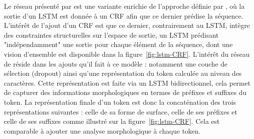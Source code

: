 \documentclass[citation\_needed]{subfiles}
\begin{document}
Le réseau présenté par \citet{lample2016neural} est une variante enrichie de l'approche définie par \citet{huang2015bidirectional}, où la sortie d'un LSTM est donnée à un CRF afin que ce dernier prédise la séquence. L'intérêt de l'ajout d'un CRF est que ce dernier, contrairement au LSTM, intègre des constraintes structurelles sur l'espace de sortie, un LSTM prédisant "indépendamment" une sortie pour chaque élément de la séquence, dont une vision d'ensemble est disponible dans la figure\ \ref{fig:lstm-CRF}. L'intérêt du réseau de \citet{lample2016neural} réside dans les ajouts qu'il fait à ce modèle : notamment une couche de sélection (dropout) ainsi qu'une représentation du token calculée au niveau des caractères. Cette représentation est faite via un LSTM bidirectionnel, cela permet de capturer des informations morphologiques en termes de préfixes et suffixes du token. La représentation finale d'un token est donc la concaténation des trois représentations suivantes : celle de sa forme de surface, celle de ses préfixes et celle de ses suffixes comme illustré sur la figure\ \ref{fig:lstm-CRF}. Cela est comparable à ajouter une analyse morphologique à chaque token.
\end{document}

